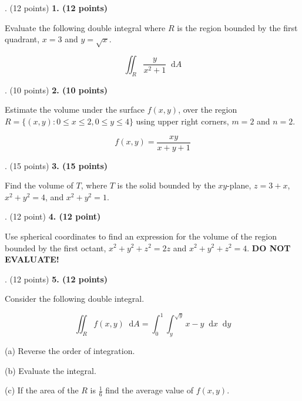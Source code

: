 \documentclass[12pt]{article}
\makeatletter
\newcommand*\dif{\mathop{}\!\mathrm{d}}
\newenvironment{problem}[1][]{%
  \bigskip%
  \noindent\begin{boxedminipage}{\columnwidth}%
  \def\@tempa{#1}%
  \ifx\@tempa\empty\else%
    \textbf{#1}\hspace{0.5em}%
  \fi%
}{%
  \end{boxedminipage}%
}
\makeatother
\begin{document}
\newpage
\begin{problem}[1. (12 points)]
Evaluate the following double integral where $R$ is the region bounded by the first quadrant, $x=3$ and $y = \sqrt{x}$.

\begin{equation*}
    \iint_R \frac{y}{x^2+1} \dif{A}
\end{equation*}
\end{problem}


\newpage
\begin{problem}[2. (10 points)]
Estimate the volume under the surface $f(x,y)$, over the region $R = \{(x,y): 0\leq x\leq 2, 0\leq y \leq 4\}$ using upper right corners, $m=2$ and $n=2$.

\begin{equation*}
    f(x,y) = \frac{xy}{x+y+1}
\end{equation*}
\end{problem}



\newpage
\begin{problem}[3. (15 points)]
Find the volume of $T$, where $T$ is the solid bounded by the $xy$-plane, $z = 3+x$, $x^2+y^2 = 4$, and $x^2+y^2 = 1$.
\end{problem}


\newpage
\begin{problem}[4. (12 point)]
Use spherical coordinates to find an expression for the volume of the region bounded by the first octant, $x^2+y^2+z^2 = 2z$ and $x^2+y^2+z^2=4$. \textbf{DO NOT EVALUATE!}
\end{problem}




\newpage
\begin{problem}[5. (12 points)]
Consider the following double integral.

\begin{equation*}
    \iint_R f(x,y) \dif{A} = \int_0^1 \int_y^{\sqrt{y}} x-y \dif{x}\dif{y}
\end{equation*}

\vspace{.25cm}

(a) Reverse the order of integration.

\vspace{.25cm}

(b) Evaluate the integral.

\vspace{.25cm}

(c) If the area of the $R$ is $\frac{1}{6}$ find the average value of $f(x,y)$.
\end{problem}
\end{document}
